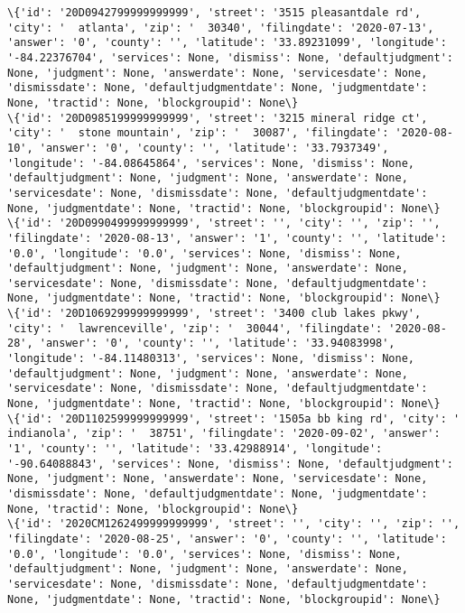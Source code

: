 \documentclass[11pt]{article}
\begin{document}
\begin{Verbatim}[commandchars=\\\{\}]
\{'id': '20D0942799999999999', 'street': '3515 pleasantdale rd', 'city': '  atlanta', 'zip': '  30340', 'filingdate': '2020-07-13', 'answer': '0', 'county': '', 'latitude': '33.89231099', 'longitude': '-84.22376704', 'services': None, 'dismiss': None, 'defaultjudgment': None, 'judgment': None, 'answerdate': None, 'servicesdate': None, 'dismissdate': None, 'defaultjudgmentdate': None, 'judgmentdate': None, 'tractid': None, 'blockgroupid': None\}
\{'id': '20D0985199999999999', 'street': '3215 mineral ridge ct', 'city': '  stone mountain', 'zip': '  30087', 'filingdate': '2020-08-10', 'answer': '0', 'county': '', 'latitude': '33.7937349', 'longitude': '-84.08645864', 'services': None, 'dismiss': None, 'defaultjudgment': None, 'judgment': None, 'answerdate': None, 'servicesdate': None, 'dismissdate': None, 'defaultjudgmentdate': None, 'judgmentdate': None, 'tractid': None, 'blockgroupid': None\}
\{'id': '20D0990499999999999', 'street': '', 'city': '', 'zip': '', 'filingdate': '2020-08-13', 'answer': '1', 'county': '', 'latitude': '0.0', 'longitude': '0.0', 'services': None, 'dismiss': None, 'defaultjudgment': None, 'judgment': None, 'answerdate': None, 'servicesdate': None, 'dismissdate': None, 'defaultjudgmentdate': None, 'judgmentdate': None, 'tractid': None, 'blockgroupid': None\}
\{'id': '20D1069299999999999', 'street': '3400 club lakes pkwy', 'city': '  lawrenceville', 'zip': '  30044', 'filingdate': '2020-08-28', 'answer': '0', 'county': '', 'latitude': '33.94083998', 'longitude': '-84.11480313', 'services': None, 'dismiss': None, 'defaultjudgment': None, 'judgment': None, 'answerdate': None, 'servicesdate': None, 'dismissdate': None, 'defaultjudgmentdate': None, 'judgmentdate': None, 'tractid': None, 'blockgroupid': None\}
\{'id': '20D1102599999999999', 'street': '1505a bb king rd', 'city': '  indianola', 'zip': '  38751', 'filingdate': '2020-09-02', 'answer': '1', 'county': '', 'latitude': '33.42988914', 'longitude': '-90.64088843', 'services': None, 'dismiss': None, 'defaultjudgment': None, 'judgment': None, 'answerdate': None, 'servicesdate': None, 'dismissdate': None, 'defaultjudgmentdate': None, 'judgmentdate': None, 'tractid': None, 'blockgroupid': None\}
\{'id': '2020CM1262499999999999', 'street': '', 'city': '', 'zip': '', 'filingdate': '2020-08-25', 'answer': '0', 'county': '', 'latitude': '0.0', 'longitude': '0.0', 'services': None, 'dismiss': None, 'defaultjudgment': None, 'judgment': None, 'answerdate': None, 'servicesdate': None, 'dismissdate': None, 'defaultjudgmentdate': None, 'judgmentdate': None, 'tractid': None, 'blockgroupid': None\}

\end{Verbatim}
\end{document}
